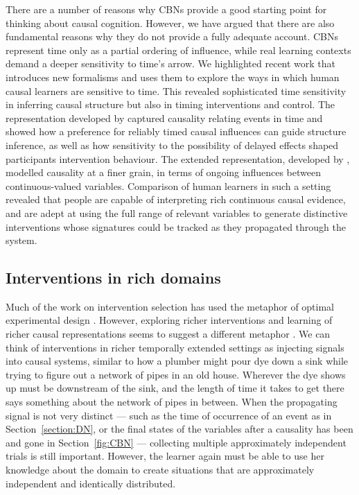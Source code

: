 \documentclass{cambridge7A}%
\begin{document}
There are a number of reasons why CBNs provide a good starting point for thinking about causal cognition.  However, we have argued that there are also fundamental reasons why they do not provide a fully adequate account.  CBNs represent time only as a partial ordering of influence, while real learning contexts demand a deeper sensitivity to time's arrow.  We highlighted recent work that introduces new formalisms and uses them to explore the ways in which human causal learners are sensitive to time.  This revealed sophisticated time sensitivity in inferring causal structure but also in timing interventions and control.  The representation developed by \cite{bramley2018time} captured causality relating events in time and showed how a preference for reliably timed causal influences can guide structure inference, as well as how sensitivity to the possibility of delayed effects shaped participants intervention behaviour.  The extended representation, developed by \cite{davis2018ctcv}, modelled causality at a finer grain, in terms of ongoing influences between continuous-valued variables. Comparison of human learners in such a setting revealed that people are capable of interpreting rich continuous causal evidence, and are adept at using the full range of relevant variables to generate distinctive interventions whose signatures could be tracked as they propagated through the system.

\subsection{Interventions in rich domains}

Much of the work on intervention selection has used the metaphor of optimal experimental design \citep{fedorov1972theory}.  However, exploring richer interventions and learning of richer causal representations seems to suggest a different metaphor \citep{coenen2017asking}.  We can think of interventions in richer temporally extended settings as injecting signals into causal systems, similar to how a plumber might pour dye down a sink while trying to figure out a network of pipes in an old house.  Wherever the dye shows up must be downstream of the sink, and the length of time it takes to get there says something about the network of pipes in between.  When the propagating signal is not very distinct --- such as the time of occurrence of an event as in Section~\ref{section:DN}, or the final states of the variables after a causality has been and gone in Section~\ref{fig:CBN} --- collecting multiple approximately independent trials is still important.  However, the learner again must be able to use her knowledge about the domain to create situations that are approximately independent and identically distributed. 
\end{document}
